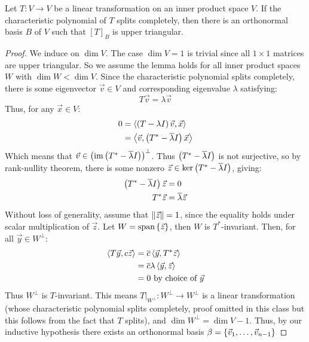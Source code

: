 \begin{lemma}[Schur]\label{schurlemma}
  Let $T : V \to V$ be a linear transformation on an inner product space $V$.
  If the characteristic polynomial of $T$ splits completely,
  then there is an orthonormal basis $B$ of $V$ such that $[T]_B$ is upper triangular.
\end{lemma}
\begin{proof}
  We induce on $\dim V$.
  The case $\dim V = 1$ is trivial since all $1 \times 1$ matrices are upper triangular.
  So we assume the lemma holds for all inner product spaces $W$ with $\dim W < \dim V$.
  Since the characteristic polynomial splits completely, there is some eigenvector $\vec v \in V$
  and corresponding eigenvalue $\lambda$ satisfying:
    $$T\vec v = \lambda \vec v$$
  Thus, for any $\vec x \in V$:
    \begin{align}
      0 &= \left\langle \left(T-\lambda I\right)\vec v , \vec x \right\rangle \\
        &= \left\langle \vec v , \left(T^*-\overline{\lambda}I\right)\vec x \right\rangle
    \end{align}
  Which means that $\vec v \in \left(\operatorname{im} \left(T^* - \overline{\lambda}I\right)\right)^\perp$.
  Thus $\left(T^*-\overline{\lambda}I\right)$ is not surjective, so by rank-nullity theorem, there is
  some nonzero $\vec z \in \ker\left(T^* - \overline{\lambda}I\right)$, giving:
    \begin{align}
      \left(T^* - \overline{\lambda}I\right) \vec z &= 0 \\
                                T^* \vec z &= \overline{\lambda} \vec z
    \end{align}
  Without loss of generality, assume that $\left\lVert\vec z\right\rVert = 1$, since the equality holds under scalar multiplication of $\vec z$.
  Let $W = \text{span}\left\{\vec z\right\}$, then $W$ is $T^*$-invariant. Then, for all $\vec y \in W^\perp$:
    \begin{align}
      \left\langle T \vec y , c \vec z \right\rangle
        &= \overline{c}\left\langle \vec y , T^* \vec z \right\rangle \\
        &= \overline{c}\lambda\left\langle \vec y , \vec z \right\rangle \\
        &= 0 \text{ by choice of } \vec y
    \end{align}
  Thus $W^\perp$ is $T$-invariant. This means $T\big\rvert_{W^\perp} : W^\perp \to W^\perp$ is a linear transformation
  (whose characteristic polynomial splits completely, proof omitted in this class but this follows from the fact that $T$ splits),
  and $\dim W^\perp = \dim V - 1$. Thus, by our inductive hypothesis there exists an orthonormal basis $\beta = \left\{\vec v_1, \ldots, \vec v_{n-1}\right\}$

\end{proof}
